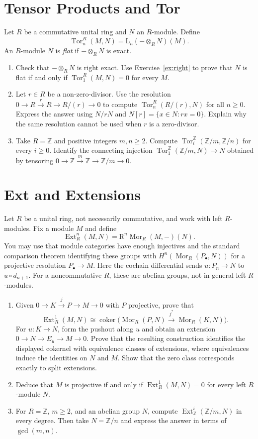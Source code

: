 \documentclass[11pt]{article}
\newcounter{result}[section]
\newcommand{\Mor}{\operatorname{Mor}}\newcommand{\im}{\operatorname{im}}\newcommand{\coker}{\operatorname{coker}}\newcommand{\A}{\mathcal A}\newcommand{\Z}{\mathbb Z}\newcommand{\id}{\mathrm{id}}\DeclareMathOperator{\Cone}{Cone}\DeclareMathOperator{\Cyl}{Cyl}
\newcommand{\LF}{\mathrm L}
\newcommand{\RF}{\mathrm R}
\DeclareMathOperator{\Tor}{Tor}
\DeclareMathOperator{\Ext}{Ext}
\begin{document}
\section{Tensor Products and Tor}\label{ex:tor}
Let $R$ be a commutative unital ring and $N$ an $R$-module. Define
\[
\Tor_n^R(M,N)=\LF_n(-\otimes_R N)(M).
\]
An $R$-module $N$ is \emph{flat} if $-\otimes_R N$ is exact.
\begin{enumerate}
\item Check that $-\otimes_R N$ is right exact. Use
Exercise~\ref{ex:right} to prove that $N$ is flat if and only if
$\Tor_1^R(M,N)=0$ for every $M$.
\item Let $r\in R$ be a non-zero-divisor. Use the resolution
$0\to R\xrightarrow{r}R\to R/(r)\to0$ to compute
$\Tor_n^R(R/(r),N)$ for all $n\geq0$. Express the answer using $N/rN$
and $N[r]=\{x\in N:rx=0\}$. Explain why the same resolution cannot
be used when $r$ is a zero-divisor.
\item Take $R=\Z$ and positive integers $m,n\geq2$. Compute
$\Tor_i^{\Z}(\Z/m,\Z/n)$ for every $i\geq0$.
Identify the connecting injection
$\Tor_1^{\Z}(\Z/m,N)\to N$ obtained by tensoring
$0\to\Z\xrightarrow{m}\Z\to\Z/m\to0$.
\end{enumerate}


\section{Ext and Extensions}\label{ex:ext}
Let $R$ be a unital ring, not necessarily commutative, and work with left
$R$-modules. Fix a module $M$ and define
\[
\Ext_R^n(M,N)=\RF^n\Mor_R(M,-)(N).
\]
You may use that module categories have enough injectives and the standard
comparison theorem identifying these groups with
$H^n(\Mor_R(P_\bullet,N))$ for a projective resolution $P_\bullet\to M$.
Here the cochain differential sends $u:P_n\to N$ to $u\circ d_{n+1}$.
For a noncommutative $R$, these are abelian groups, not in general left
$R$-modules.
\begin{enumerate}
\item Given $0\to K\xrightarrow{j}P\to M\to0$ with $P$ projective,
prove that
\[
\Ext_R^1(M,N)\cong
\coker\bigl(\Mor_R(P,N)\xrightarrow{j^*}\Mor_R(K,N)\bigr).
\]
For $u:K\to N$, form the pushout along $u$ and obtain an extension
$0\to N\to E_u\to M\to0$. Prove that the resulting construction
identifies the displayed cokernel with equivalence classes of extensions,
where equivalences induce the identities on $N$ and $M$.
Show that the zero class corresponds exactly to split extensions.
\item Deduce that $M$ is projective if and only if
$\Ext_R^1(M,N)=0$ for every left $R$-module $N$.
\item For $R=\Z$, $m\geq2$, and an abelian group $N$, compute
$\Ext_{\Z}^i(\Z/m,N)$ in every degree. Then take $N=\Z/n$ and express
the answer in terms of $\gcd(m,n)$.
\end{enumerate}
\end{document}
